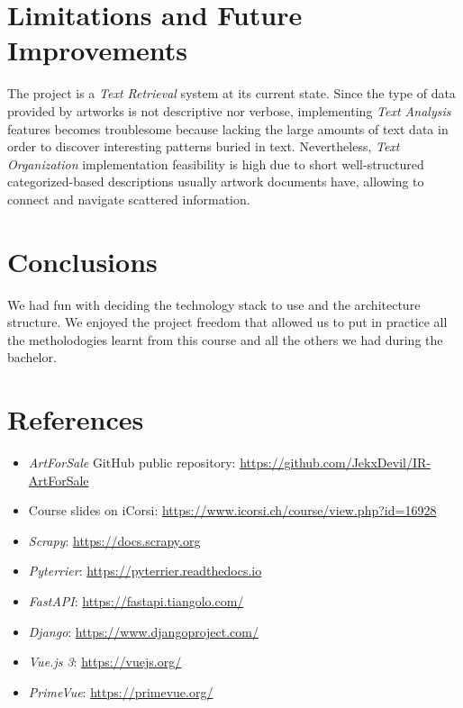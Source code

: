\documentclass[12pt]{spieman}  %
\begin{document}
\begin{spacing}{1}
    \section{Limitations and Future Improvements}

    The project is a \textit{Text Retrieval} system at its current state.
    Since the type of data provided by artworks is not descriptive nor verbose,
    implementing \textit{Text Analysis} features becomes troublesome because lacking the large amounts of
    text data in order to discover interesting patterns buried in text.
    Nevertheless, \textit{Text Organization} implementation feasibility is high due to
    short well-structured categorized-based descriptions usually artwork documents have,
    allowing to connect and navigate scattered information.

    \section{Conclusions}
    We had fun with deciding the technology stack to use and the architecture structure.
    We enjoyed the project freedom that allowed us to put in practice all the metholodogies
    learnt from this course and all the others we had during the bachelor.

    \section{References}\label{sec:references}
    \begin{itemize}
        \item \textit{ArtForSale} GitHub public repository: \url{https://github.com/JekxDevil/IR-ArtForSale}
        \item Course slides on iCorsi: \url{https://www.icorsi.ch/course/view.php?id=16928}
        \item \textit{Scrapy}: \url{https://docs.scrapy.org}
        \item \textit{Pyterrier}: \url{https://pyterrier.readthedocs.io}
        \item \textit{FastAPI}: \url{https://fastapi.tiangolo.com/}
        \item \textit{Django}: \url{https://www.djangoproject.com/}
        \item \textit{Vue.js 3}: \url{https://vuejs.org/}
        \item \textit{PrimeVue}: \url{https://primevue.org/}
    \end{itemize}

\end{spacing}
\end{document}
